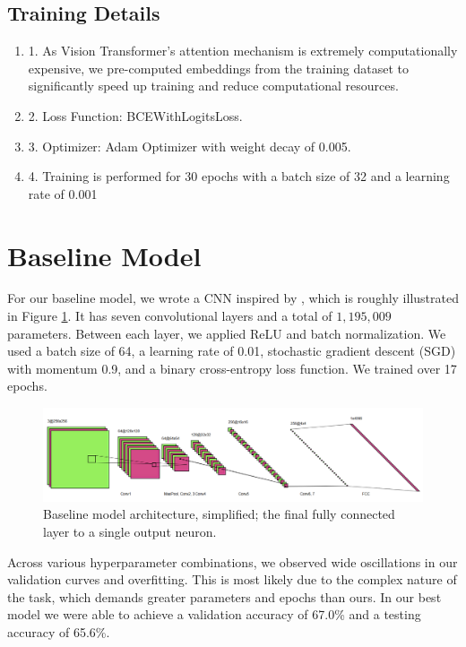 \documentclass{article} %
\begin{document}
\subsection{Training Details}
\begin {enumerate}
    \item[1.]As Vision Transformer's attention mechanism is extremely computationally expensive, we pre-computed embeddings from the training dataset to significantly speed up training and reduce computational resources.
    \item[2.]Loss Function: BCEWithLogitsLoss.
    \item[3.]Optimizer: Adam Optimizer with weight decay of 0.005.
    \item[4.]Training is performed for 30 epochs with a batch size of 32 and a learning rate of 0.001
\end{enumerate}

\section{Baseline Model}

For our baseline model, we wrote a CNN inspired by \citet{wang2020cnngeneratedimagessurprisinglyeasy}, which is roughly illustrated in Figure \ref{fig:baseline_arch}. It has seven convolutional layers and a total of $1,195,009$ parameters. Between each layer, we applied ReLU and batch normalization. We used a batch size of 64, a learning rate of 0.01, stochastic gradient descent (SGD) with momentum 0.9, and a binary cross-entropy loss function. We trained over 17 epochs.

\begin{figure}[h]
    \begin{center}
        \includegraphics[scale=0.45]{figs/baseline.png}
    \end{center}
    \caption{Baseline model architecture, simplified; the final fully connected layer to a single output neuron.}
    \label{fig:baseline_arch}
\end{figure}

Across various hyperparameter combinations, we observed wide oscillations in our validation curves and overfitting. This is most likely due to the complex nature of the task, which demands greater parameters and epochs than ours. In our best model we were able to achieve a validation accuracy of 67.0\% and a testing accuracy of 65.6\%.
\end{document}

